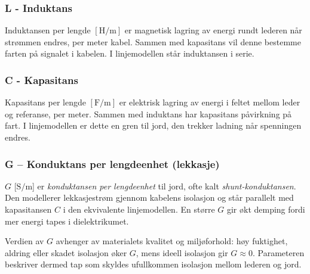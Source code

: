 \subsubsection{L - Induktans}
Induktansen per lengde $[\mathrm{H}/\mathrm{m}]$ er magnetisk lagring av energi rundt lederen når strømmen endres, per meter kabel. Sammen med kapasitans vil denne bestemme farten på signalet i kabelen. I linjemodellen står induktansen i serie.

\subsubsection{C - Kapasitans}
Kapasitans per lengde $[\mathrm{F}/\mathrm{m}]$ er elektrisk lagring av energi i feltet mellom leder og referanse, per meter. Sammen med induktans har kapasitans påvirkning på fart. I linjemodellen er dette en gren til jord, den trekker ladning når spenningen endres.

\subsubsection{G -- Konduktans per lengdeenhet (lekkasje)}
$G$ [$\mathrm{S/m}$] er \textit{konduktansen per lengdeenhet} til jord, ofte kalt 
\textit{shunt-konduktansen}. Den modellerer lekkasjestrøm gjennom kabelens isolasjon og står 
parallelt med kapasitansen $C$ i den ekvivalente linjemodellen. En større $G$ gir økt demping 
fordi mer energi tapes i dielektrikumet. 

Verdien av $G$ avhenger av materialets kvalitet og miljøforhold: høy fuktighet, aldring eller 
skadet isolasjon øker $G$, mens ideell isolasjon gir $G \approx 0$. Parameteren beskriver dermed 
tap som skyldes ufullkommen isolasjon mellom lederen og jord.
\clearpage
